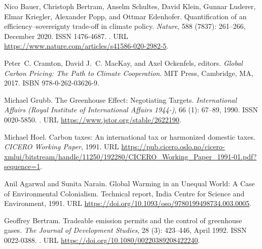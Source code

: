 \begin{thebibliography}{55}
  Nico Bauer, Christoph Bertram, Anselm Schultes, David Klein, Gunnar Luderer,
    Elmar Kriegler, Alexander Popp, and Ottmar Edenhofer.
  \newblock Quantification of an efficiency--sovereignty trade-off in climate
    policy.
  \newblock \emph{Nature}, 588 (7837): 261--266, December 2020.
  \newblock ISSN 1476-4687.
  \newblock {}.
  \newblock URL \url{https://www.nature.com/articles/s41586-020-2982-5}.
  
  Peter~C. Cramton, David J.~C. MacKay, and Axel Ockenfels, editors.
  \newblock \emph{Global Carbon Pricing: The Path to Climate Cooperation}.
  \newblock MIT Press, Cambridge, MA, 2017.
  \newblock ISBN 978-0-262-03626-9.
  
  Michael Grubb.
  \newblock The {{Greenhouse Effect}}: {{Negotiating Targets}}.
  \newblock \emph{International Affairs (Royal Institute of International Affairs
    1944-)}, 66 (1): 67--89, 1990.
  \newblock ISSN 0020-5850.
  \newblock {}.
  \newblock URL \url{https://www.jstor.org/stable/2622190}.
  
  Michael Hoel.
  \newblock Carbon taxes: {{An}} international tax or harmonized domestic taxes.
  \newblock \emph{CICERO Working Paper}, 1991.
  \newblock URL
    \url{https://pub.cicero.oslo.no/cicero-xmlui/bitstream/handle/11250/192280/CICERO\_Working\_Paper\_1991-01.pdf?sequence=1}.
  
  Anil Agarwal and Sunita Narain.
  \newblock Global {{Warming}} in an {{Unequal World}}: {{A Case}} of
    {{Environmental Colonialism}}.
  \newblock Technical report, {India Centre for Science and Environment}, 1991.
  \newblock URL \url{https://doi.org/10.1093/oso/9780199498734.003.0005}.
  
  Geoffrey Bertram.
  \newblock Tradeable emission permits and the control of greenhouse gases.
  \newblock \emph{The Journal of Development Studies}, 28 (3):
    423--446, April 1992.
  \newblock ISSN 0022-0388.
  \newblock {}.
  \newblock URL \url{https://doi.org/10.1080/00220389208422240}.
  

\end{thebibliography}
